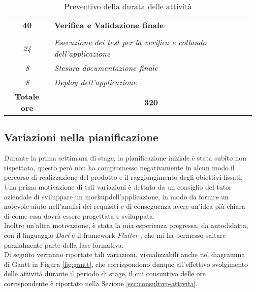 \begin{table}
\begin{tabularx}{\textwidth}{|c|X|}
            \textbf{40} & \textbf{Verifica e Validazione finale}  \\ \hdashline 
            \multirow{3}{0cm}\\ 
            \textit{24} & 
            \textit{Esecuzione dei test per la verifica e collaudo dell'applicazione} \\
            \textit{8} & 
            \textit{Stesura documentazione finale} \\
            \textit{8} & 
            \textit{Deploy dell'applicazione} \\
            \hline
            
            \textbf{Totale ore} & \multicolumn{1}{|c|}{\textbf{320}} \\ 
            \hline
            
        \end{tabularx}
        \caption{Preventivo della durata delle attività}
        \label{tab:preventivo-ore}
    \end{table}

\subsection{Variazioni nella pianificazione}
\label{subsec:variazione-pianificazione}

Durante la prima settimana di stage, la pianificazione iniziale è stata subito non rispettata, questo però non ha compromesso negativamente in alcun modo il percorso di realizzazione del prodotto e il raggiungimento degli obiettivi fissati.\\
Una prima motivazione di tali variazioni è dettata da un consiglio del tutor aziendale di sviluppare un \gls{mockup}\glsoccur dell'applicazione, in modo da fornire un notevole aiuto nell'analisi dei requisiti e di conseguenza avere un'idea più chiara di come essa dovrà essere progettata e sviluppata.\\
Inoltre un'altra motivazione, è stata la mia esperienza pregressa, da autodidatta, con il linguaggio \emph{Dart} \cite{site:dart} e il framework \emph{Flutter} \cite{site:flutter}, che mi ha permesso saltare parzialmente parte della fase formativa.\\
Di seguito verranno riportate tali variazioni, visualizzabili anche nel diagramma di Gantt in Figura \ref{fig:gantt}, che corrispondono dunque all'effettivo svolgimento delle attività durante il periodo di stage, il cui consuntivo delle ore corrispondente è riportato nella Sezione \ref{sec:consultivo-attivita}.

